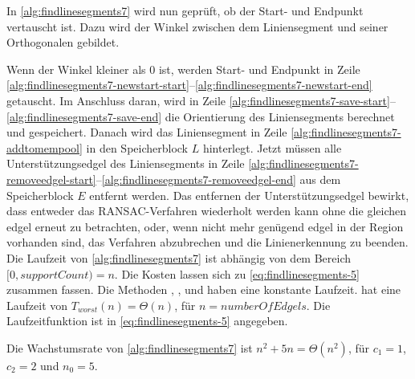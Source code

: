 In \autoref{alg:findlinesegments7} wird nun geprüft, ob der Start- und Endpunkt vertauscht ist. Dazu wird der Winkel
 zwischen dem Liniensegment und seiner Orthogonalen gebildet.

Wenn der Winkel kleiner als $0$ ist, werden Start- und Endpunkt in Zeile
 \ref{alg:findlinesegments7-newstart-start}--\ref{alg:findlinesegments7-newstart-end} getauscht. Im Anschluss daran,
 wird in Zeile \ref{alg:findlinesegments7-save-start}--\ref{alg:findlinesegments7-save-end} die Orientierung des
 Liniensegments berechnet und gespeichert. Danach wird das Liniensegment in Zeile
 \ref{alg:findlinesegments7-addtomempool} in den Speicherblock $L$ hinterlegt. Jetzt müssen alle Unterstützungsedgel
 des Liniensegments in Zeile \ref{alg:findlinesegments7-removeedgel-start}--\ref{alg:findlinesegments7-removeedgel-end}
 aus dem Speicherblock $E$ entfernt werden. Das entfernen der Unterstützungsedgel bewirkt, dass entweder das
 RANSAC-Verfahren wiederholt werden kann ohne die gleichen \gls{edgel} erneut zu betrachten, oder, wenn nicht mehr
 genügend \gls{edgel} in der Region vorhanden sind, das Verfahren abzubrechen und die Linienerkennung zu beenden. Die
 Laufzeit von \autoref{alg:findlinesegments7} ist abhängig von dem Bereich $[0,\mathit{supportCount}) = n$. Die
 Kosten lassen sich zu \autoref{eq:findlinesegments-5} zusammen fassen. Die Methoden ,
 ,  und  haben eine konstante Laufzeit.
  hat eine Laufzeit von $T_{worst}(n)=\Theta(n)$, für $n = \mathit{numberOfEdgels}$. Die
 Laufzeitfunktion ist in \autoref{eq:findlinesegments-5} angegeben.

Die Wachstumsrate von \autoref{alg:findlinesegments7} ist $n^2 + 5n = \Theta(n^2)$, für $c_{1} = 1$, $c_{2} = 2$ und
 $n_{0} = 5$.

